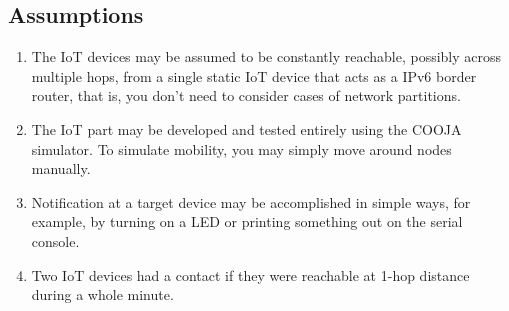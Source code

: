 \documentclass[table, 12pt]{article}
\begin{document}
\subsection{Assumptions}
\begin{enumerate}[label=\textbf{A\arabic*:}]
    \item The IoT devices may be assumed to be constantly reachable, possibly across multiple hops, from a single static IoT device that acts as a IPv6 border router, that is, you don’t need to consider cases of network partitions.
    \item The IoT part may be developed and tested entirely using the COOJA simulator. To simulate mobility, you may simply move around nodes manually.
    \item Notification at a target device may be accomplished in simple ways, for example, by turning on a LED or printing something out on the serial console.
    \item Two IoT devices had a contact if they were reachable at 1-hop distance during a whole minute.
\end{enumerate}
\end{document}
